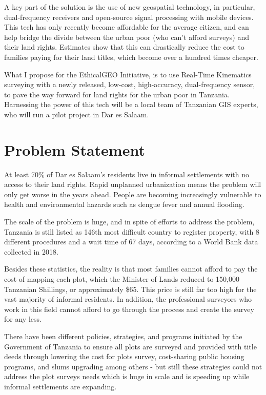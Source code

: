 \documentclass[a4paper,12pt,twoside]{article}
\begin{document}
A key part of the solution is the use of new geospatial technology, in particular, dual-frequency receivers and open-source signal processing with mobile devices. This tech has only recently become affordable for the average citizen, and can help bridge the divide between the urban poor (who can’t afford surveys) and their land rights. Estimates show that this can drastically reduce the cost to families paying for their land titles, which become over a hundred times cheaper. 
\bigskip

What I propose for the EthicalGEO Initiative, is to use Real-Time Kinematics surveying with a newly released, low-cost, high-accuracy, dual-frequency sensor, to pave the way forward for land rights for the urban poor in Tanzania. Harnessing the power of this tech will be a local team of Tanzanian GIS experts, who will run a pilot project in Dar es Salaam. 


\section{Problem Statement}
At least 70\% of Dar es Salaam’s residents live in informal settlements with no access to their land rights. Rapid unplanned urbanization means the problem will only get worse in the years ahead. People are becoming increasingly vulnerable to health and environmental hazards such as dengue fever and annual flooding. 
\bigskip

The scale of the problem is huge, and in spite of efforts to address the problem, Tanzania is still listed as 146th most difficult country to register property, with 8 different procedures and a wait time of 67 days, according to a World Bank data collected in 2018. 
\bigskip

Besides these statistics, the reality is that most families cannot afford to pay the cost of mapping each plot, which the Minister of Lands reduced to 150,000 Tanzanian Shillings, or approximately \$65. This price is still far too high for the vast majority of informal residents. In addition, the professional surveyors who work in this field cannot afford to go through the process and create the survey for any less.
\bigskip

There have been different policies, strategies, and programs initiated by the Government of Tanzania to ensure all plots are surveyed and provided with title deeds through lowering the cost for plots survey, cost-sharing public housing programs, and slums upgrading among others - but still these strategies could not address the plot surveys needs which is huge in scale and is speeding up while informal settlements are expanding. 
\bigskip
\end{document}
